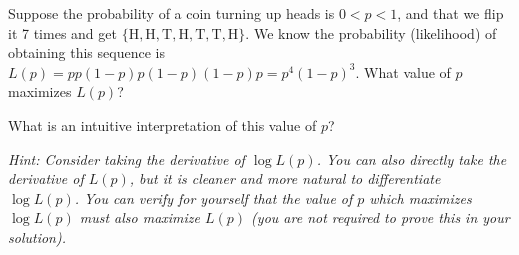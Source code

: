 \item {}

Suppose the probability of a coin turning up heads is $0 < p < 1$, and that
we flip it 7 times and get $\{ \text{H}, \text{H}, \text{T}, \text{H}, \text{T}
, \text{T}, \text{H}  \}$. We know the probability (likelihood) of obtaining
this sequence is $L(p) = p p (1-p) p (1-p) (1-p) p = p^4(1-p)^3$. What value of
$p$ maximizes $L(p)$?

What is an intuitive interpretation of this value of $p$?

{\em Hint: Consider taking the derivative of $\log L(p)$. You can also directly
take the derivative of $L(p)$, but it is cleaner and more natural to
differentiate $\log L(p)$. You can verify for yourself that the value of $p$
which maximizes $\log L(p)$ must also maximize $L(p)$ (you are not required to
prove this in your solution).}
